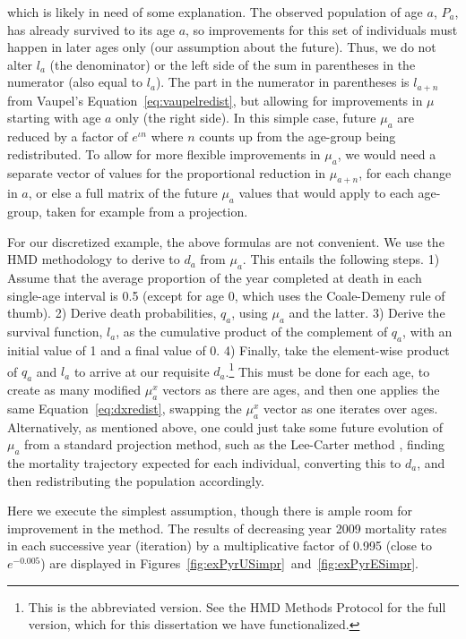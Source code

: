 which is likely in need of some explanation. The observed population of age $a$,
$P_a$, has already survived to its age $a$, so improvements for this set of
individuals must happen in later ages only (our assumption about the future).
Thus, we do not alter $l_a$ (the denominator) or the left side of the sum in
parentheses in the numerator (also equal to $l_a$). The part in the numerator in
parentheses is $l_{a+n}$ from Vaupel's Equation~\eqref{eq:vaupelredist}, but allowing
for improvements in $\mu$ starting with age $a$ only (the right side). In this
simple case, future $\mu_a$ are reduced by a factor of $e^{\iota n}$ where 
$n$ counts up from the age-group being redistributed. To allow for more flexible
improvements in $\mu_a$, we would need a separate vector of values for the
proportional reduction in $\mu_{a+n}$, for each change in $a$, or else a full
matrix of the future $\mu_a$ values that would apply to each age-group, taken
for example from a projection.

For our discretized example, the above formulas are not convenient. We use the
HMD methodology to derive to $d_a$ from $\mu_a$. This entails the following
steps. 1) Assume that the average proportion of the year completed at death in
each single-age interval is 0.5 (except for age 0, which uses the Coale-Demeny
rule of thumb). 2) Derive death probabilities, $q_a$, using $\mu_a$ and the
latter. 3) Derive the survival function, $l_a$, as the cumulative product of
the complement of $q_a$, with an initial value of 1 and a final value of 0. 4)
Finally, take the element-wise product of $q_a$ and $l_a$ to arrive at our
requisite $d_a$.\footnote{This is the abbreviated version. See the HMD Methods
Protocol \citep{wilmoth2007methods} for the full version, which for this
dissertation we have functionalized.} This must be done for each age, to create as many modified $\mu _a^x $ vectors as there 
are ages, and then one applies the same Equation~\eqref{eq:dxredist}, swapping
the $\mu _a^x$ vector as one iterates over ages. Alternatively, as mentioned above,
one could just take some future evolution of $\mu_a$ from a standard projection method, such as the Lee-Carter method
\citep{lee1992modeling}, finding the mortality trajectory expected for each individual, converting
this to $d_a$, and then redistributing the population accordingly. 

Here we execute the simplest assumption, though there is ample room for
improvement in the method. The results of decreasing year 2009 mortality rates
in each successive year (iteration) by a multiplicative factor of 0.995 (close to
$e^{-0.005}$) are displayed in
Figures~\ref{fig:exPyrUSimpr}~and~\ref{fig:exPyrESimpr}.

